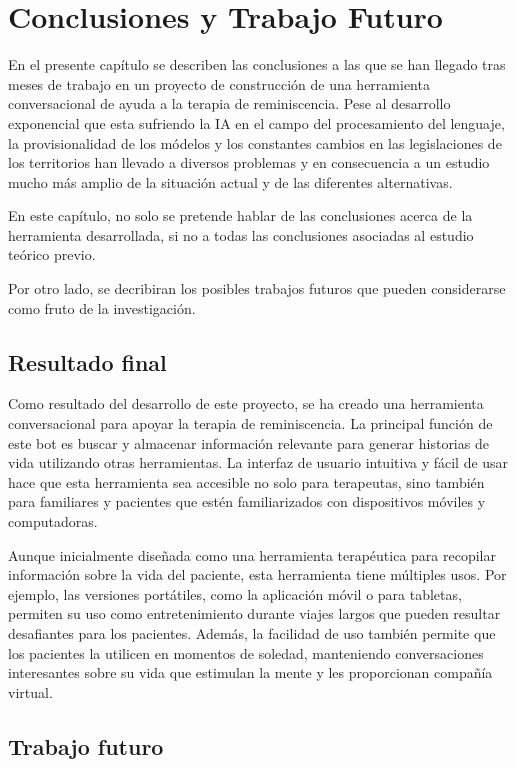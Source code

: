\chapter{Conclusiones y Trabajo Futuro}
\label{cap:conclusiones}
En el presente capítulo se describen las conclusiones a las que se han llegado tras meses de trabajo en un proyecto de construcción de una herramienta conversacional de ayuda a la terapia de reminiscencia. Pese al desarrollo exponencial que esta sufriendo la IA en el campo del procesamiento del lenguaje, la provisionalidad de los módelos y los constantes cambios en las legislaciones de los territorios han llevado a diversos problemas y en consecuencia a un estudio mucho más amplio de la situación actual y de las diferentes alternativas. 

En este capítulo, no solo se pretende hablar de las conclusiones acerca de la herramienta desarrollada, si no a todas las conclusiones asociadas al estudio teórico previo. 

Por otro lado, se decribiran los posibles trabajos futuros que pueden considerarse como fruto de la investigación.


\section{Resultado final}
Como resultado del desarrollo de este proyecto, se ha creado una herramienta conversacional para apoyar la terapia de reminiscencia. La principal función de este bot es buscar y almacenar información relevante para generar historias de vida utilizando otras herramientas. La interfaz de usuario intuitiva y fácil de usar hace que esta herramienta sea accesible no solo para terapeutas, sino también para familiares y pacientes que estén familiarizados con dispositivos móviles y computadoras.

Aunque inicialmente diseñada como una herramienta terapéutica para recopilar información sobre la vida del paciente, esta herramienta tiene múltiples usos. Por ejemplo, las versiones portátiles, como la aplicación móvil o para tabletas, permiten su uso como entretenimiento durante viajes largos que pueden resultar desafiantes para los pacientes. Además, la facilidad de uso también permite que los pacientes la utilicen en momentos de soledad, manteniendo conversaciones interesantes sobre su vida que estimulan la mente y les proporcionan compañía virtual.

\section{Trabajo futuro}


